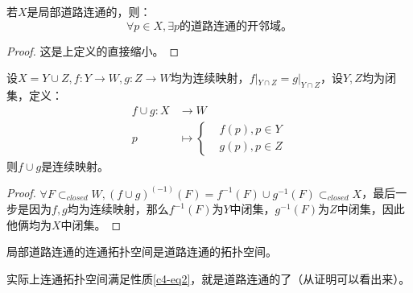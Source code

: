 \documentclass[lang=cn,10pt,device=pad]{elegantbook}
\newcommand{\hanshu}[1]{\left\{ \begin{aligned}
					#1
					\end{aligned} \right.}
\begin{document}
\begin{note}
若$X$是局部道路连通的，则：
\begin{equation}\label{c4-eq2}
	\forall p\in X,\exists p\text{的道路连通的开邻域。}	
\end{equation}
\end{note}
\begin{proof}
	这是上定义的直接缩小。
\end{proof}



\begin{lemma}[Glueing引理]\label{c4-y1}
	设$X = Y\cup Z,f:Y\longrightarrow W,g:Z\longrightarrow W$均为连续映射，$f|_{Y\cap Z} = g|_{Y\cap Z}$，设$Y,Z$均为闭集，定义：
	\begin{equation*}
		\begin{aligned}
			f\cup g:X&\longrightarrow W\\
			p&\longmapsto \hanshu{&f(p),p\in Y\\
			&g(p),p\in Z}
		\end{aligned}
	\end{equation*}
	则$f\cup g$是连续映射。
\end{lemma}	
\begin{proof}
	$\forall F\subset_{closed}W,(f\cup g)^(-1)(F) = f^{-1}(F)\cup g^{-1}(F)\subset_{closed}X$，最后一步是因为$f,g$均为连续映射，那么$f^{-1}(F)$为$Y$中闭集，$g^{-1}(F)$为$Z$中闭集，因此他俩均为$X$中闭集。
\end{proof}
\begin{proposition}\label{c4-m12}
	局部道路连通的连通拓扑空间是道路连通的拓扑空间。
\end{proposition}
\begin{note}
实际上连通拓扑空间满足性质\ref{c4-eq2}，就是道路连通的了（从证明可以看出来）。	
\end{note}
\end{document}
